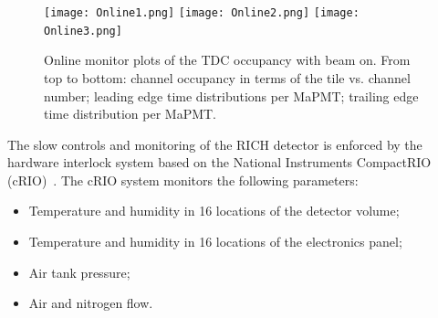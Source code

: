 \documentclass[5p,times,twocolumn]{elsarticle}
\begin{document}
\begin{figure}[t]
\begin{center}
\texttt{[image: Online1.png]}
\texttt{[image: Online2.png]}
\texttt{[image: Online3.png]}
\end{center}
\caption{Online monitor plots of the TDC occupancy with beam on. From top to bottom: channel occupancy in terms of the
  tile vs. channel number; leading edge time distributions per MaPMT; trailing edge time distribution per MaPMT.}
\label{fig:Online_TDC}
\end{figure}




The slow controls and monitoring of the RICH detector is enforced by the hardware interlock system based on the
National Instruments CompactRIO (cRIO)~\cite{Ref:cRIO}.
The cRIO system monitors the following parameters:
\begin{itemize}
\item Temperature and humidity in 16 locations of the detector volume;
\item Temperature and humidity in 16 locations of the electronics panel;
\item Air tank pressure;
\item Air and nitrogen flow. 
\end{itemize}
\end{document}

